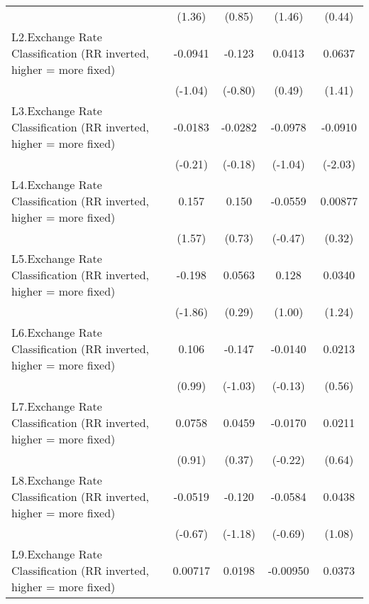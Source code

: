 {\begin{longtable}{l*{4}{c}}
                &   (1.36)         &   (0.85)         &   (1.46)         &   (0.44)         \\
\addlinespace
L2.Exchange Rate Classification (RR inverted, higher = more fixed)&  -0.0941         &   -0.123         &   0.0413         &   0.0637         \\
                &  (-1.04)         &  (-0.80)         &   (0.49)         &   (1.41)         \\
\addlinespace
L3.Exchange Rate Classification (RR inverted, higher = more fixed)&  -0.0183         &  -0.0282         &  -0.0978         &  -0.0910\sym{*}  \\
                &  (-0.21)         &  (-0.18)         &  (-1.04)         &  (-2.03)         \\
\addlinespace
L4.Exchange Rate Classification (RR inverted, higher = more fixed)&    0.157         &    0.150         &  -0.0559         &  0.00877         \\
                &   (1.57)         &   (0.73)         &  (-0.47)         &   (0.32)         \\
\addlinespace
L5.Exchange Rate Classification (RR inverted, higher = more fixed)&   -0.198         &   0.0563         &    0.128         &   0.0340         \\
                &  (-1.86)         &   (0.29)         &   (1.00)         &   (1.24)         \\
\addlinespace
L6.Exchange Rate Classification (RR inverted, higher = more fixed)&    0.106         &   -0.147         &  -0.0140         &   0.0213         \\
                &   (0.99)         &  (-1.03)         &  (-0.13)         &   (0.56)         \\
\addlinespace
L7.Exchange Rate Classification (RR inverted, higher = more fixed)&   0.0758         &   0.0459         &  -0.0170         &   0.0211         \\
                &   (0.91)         &   (0.37)         &  (-0.22)         &   (0.64)         \\
\addlinespace
L8.Exchange Rate Classification (RR inverted, higher = more fixed)&  -0.0519         &   -0.120         &  -0.0584         &   0.0438         \\
                &  (-0.67)         &  (-1.18)         &  (-0.69)         &   (1.08)         \\
\addlinespace
L9.Exchange Rate Classification (RR inverted, higher = more fixed)&  0.00717         &   0.0198         & -0.00950         &   0.0373         \\

\end{longtable}}
